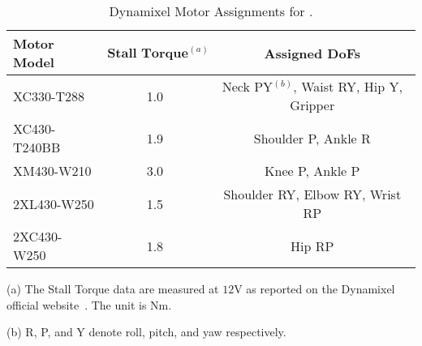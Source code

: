 \begin{table}[t]
\centering
\caption{Dynamixel Motor Assignments for \system.}
\setlength{\tabcolsep}{0pt}
\begin{threeparttable}
\begin{tabular}{@{}lcc@{}} %
\toprule
\textbf{Motor Model} & $\textbf{Stall Torque}^{(a)}$	&\textbf{Assigned DoFs} \\ \midrule
XC330-T288  & 1.0          & Neck PY$^{(b)}$, Waist RY, Hip Y, Gripper \\
XC430-T240BB  & 1.9             & Shoulder P, Ankle R \\
XM430-W210  & 3.0             & Knee P, Ankle P \\ 
2XL430-W250 & 1.5             & Shoulder RY, Elbow RY, Wrist RP \\
2XC430-W250 & 1.8          & Hip RP \\ \bottomrule
\end{tabular}
\begin{tablenotes}
\item[{(a)}] The Stall Torque data are measured at $12\mathrm{V}$ as reported on the Dynamixel official website~\citep{nameintroductiona}. The unit is $\mathrm{Nm}.$
\item[{(b)}] R, P, and Y denote roll, pitch, and yaw respectively.
\end{tablenotes}
\end{threeparttable}

\label{tab:dynamixel}
\vspace{-3mm}
\end{table}
